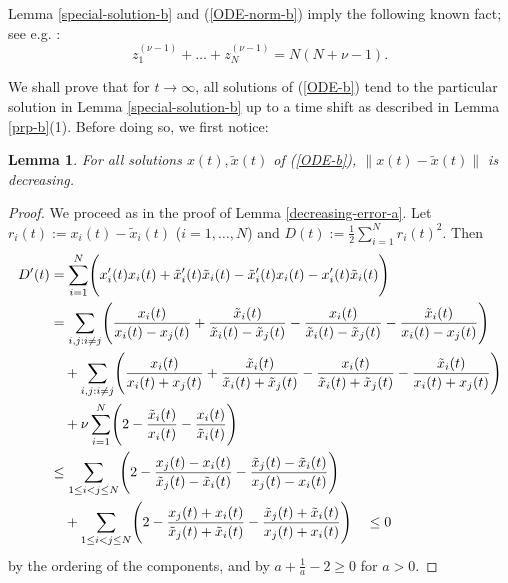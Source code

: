 \documentclass[reqno]{amsart}
\theoremstyle{plain}
\newtheorem{lemma}[theorem]{Lemma}
\theoremstyle{definition}
\numberwithin{equation}{section}
\begin{document}
 Lemma \ref{special-solution-b} and (\ref{ODE-norm-b})  imply the following known fact; see  e.g. \cite{AKM2}:
\begin{equation}\label{ODE-norm-laguerre-zeros}
  z_1^{(\nu-1)}+\ldots+z_N^{(\nu-1)}=N(N+\nu-1).
\end{equation}


We shall prove that for $t\to\infty$, all solutions of  (\ref{ODE-b}) tend to the particular solution 
in Lemma \ref{special-solution-b} up to a time shift as described  in Lemma \ref{prp-b}(1).
Before doing so, we first notice:

 \begin{lemma}\label{decreasing-error-b}
For all solutions $x(t),\tilde x(t)$ of  (\ref{ODE-b}),  $\|x(t)-\tilde x(t)\|$ is decreasing.
 \end{lemma}


 \begin{proof} We proceed as in the proof of Lemma \ref{decreasing-error-a}.
   Let $r_i(t):=x_i(t)-\tilde x_i(t)$ ($i=1,\ldots,N$) and $D(t):=\frac{1}{2}\sum_{i=1}^N r_i(t)^2$. Then
   \begin{align}\label{error-est-b}
D^\prime(t) &= \sum_{i=1}^N\Biggl( x_i^\prime(t)x_i(t) +\tilde x_i^\prime(t)\tilde x_i(t)- {\tilde x_i}^\prime(t)x_i(t)- x_i^\prime(t)\tilde x_i(t)
     \Biggr)\notag\\
     &= \sum_{i,j: i\ne j}\Biggl(\frac{x_i(t)}{x_i(t)-x_j(t)}+\frac{\tilde x_i(t)}{\tilde x_i(t)-\tilde x_j(t)}-
     \frac{ x_i(t)}{\tilde x_i(t)-\tilde x_j(t)}-\frac{\tilde x_i(t)}{ x_i(t)- x_j(t)} \Biggr)\notag\\
&\quad + \sum_{i,j: i\ne j}\Biggl(\frac{x_i(t)}{x_i(t)+x_j(t)}+\frac{\tilde x_i(t)}{\tilde x_i(t)+\tilde x_j(t)}-
     \frac{ x_i(t)}{\tilde x_i(t)+\tilde x_j(t)}-\frac{\tilde x_i(t)}{ x_i(t)+x_j(t)} \Biggr)\notag\\
     &\quad +\nu\sum_{i=1}^N \Biggl(2-\frac{\tilde x_i(t)}{ x_i(t)}-\frac{ x_i(t)}{\tilde x_i(t)}\Biggr)\notag\\
     &\le
     \sum_{1\le i< j\le N} \Biggl(2-  \frac{ x_j(t) - x_i(t)}{\tilde x_j(t)-\tilde x_i(t)}- \frac{\tilde x_j(t) -\tilde x_i(t)}{x_j(t)- x_i(t)}\Biggr)
\notag\\
&\quad +\sum_{1\le i< j\le N}
\Biggl(2-  \frac{ x_j(t) + x_i(t)}{\tilde x_j(t)+\tilde x_i(t)}- \frac{\tilde x_j(t) +\tilde x_i(t)}{x_j(t)+ x_i(t)}\Biggr)
\quad \le0
   \end{align}
 by the ordering of the components, and by $a+\frac{1}{a}-2\ge 0$ for  $a>0$.
   \end{proof}
\end{document}
